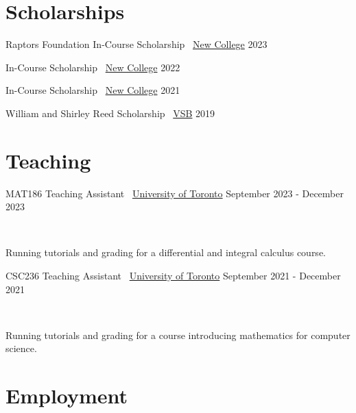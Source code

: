 \documentclass[]{style}
\begin{document}
\section{Scholarships}

\begin{entrylist}

\vspace{-3mm}
\entry
{Raptors Foundation In-Course Scholarship \ {\normalfont \underline{New College}}}
{2023}
{}

\vspace{-3mm}
\entry
{In-Course Scholarship \ {\normalfont \underline{New College}}}
{2022}
{}

\vspace{-3mm}
\entry
{In-Course Scholarship \ {\normalfont \underline{New College}}}
{2021}
{}

\vspace{-3mm}
\entry
{William and Shirley Reed Scholarship \ {\normalfont \underline{VSB}}}
{2019}
{}

\end{entrylist}

\section{Teaching}

\begin{entrylist}

\vspace{1mm}

\entry
{MAT186 Teaching Assistant \ {\normalfont \underline{University of Toronto}}}
{September 2023 - December 2023}
{ ~ \vspace{-2.5mm}

Running tutorials and grading for a differential and integral calculus course.
}


\entry
{CSC236 Teaching Assistant \ {\normalfont \underline{University of Toronto}}}
{September 2021 - December 2021}
{ ~ \vspace{-2.5mm}

Running tutorials and grading for a course introducing mathematics for computer science.
}

\end{entrylist}

\section{Employment}
\end{document}
